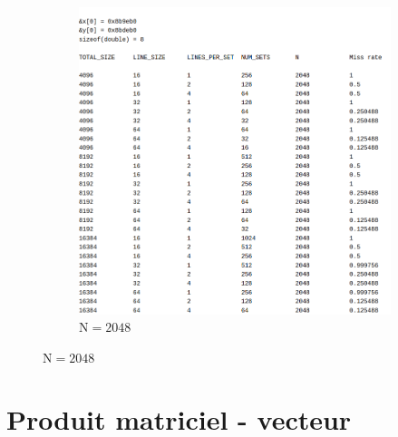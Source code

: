 \documentclass[12pt]{base}
\begin{document}
\begin{figure}[H]
\begin{subfigure}[H]{0.5\linewidth}
    \includegraphics[width=0.75\linewidth]{1_scal_2048.png}
    \caption{$\text{N}=2048$}
    \label{fig:1_2048}
\end{subfigure}
\end{figure}


\newpage
\section{Produit matriciel - vecteur}
\end{document}
